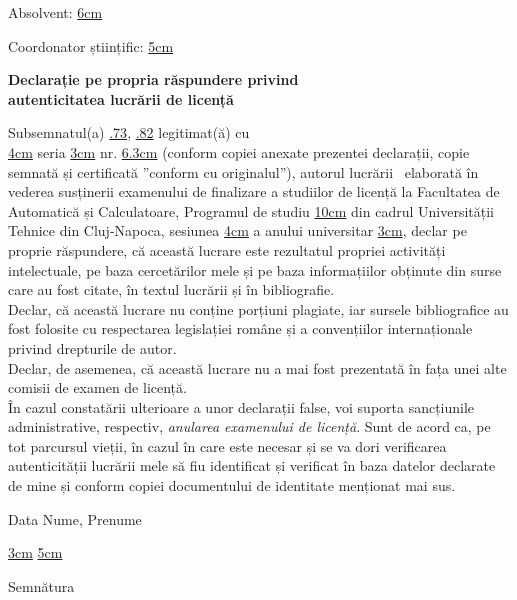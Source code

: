 \hspace{6cm} Absolvent: \uline{6cm} 

\vspace{0.5cm}
\hspace{6cm} Coordonator științific: \uline{5cm} 
\newpage
\begin{center}
	{\department}
\end{center}
\vspace{0.5cm}

\begin{center}
	{\bf Declarație pe propria răspundere privind\\ 
		autenticitatea lucrării de licență}
\end{center}
\vspace{1cm}

\begin{minipage}{\linewidth}
	Subsemnatul(a) \uline{.73\linewidth},
	\uline{.82\linewidth}
	legitimat(ă) cu\\ \uline{4cm} seria \uline{3cm} nr. \uline{6.3cm}
	(conform copiei anexate prezentei declarații, copie semnată și certificată ”conform cu originalul”), autorul lucrării\
	\uline{\linewidth}
	\uline{\linewidth}
	\uline{\linewidth}
	elaborată în vederea susținerii examenului de finalizare a studiilor de licență la Facultatea de Automatică și Calculatoare, Programul de studiu \uline{10cm} din cadrul Universității Tehnice din Cluj-Napoca, sesiunea \uline{4cm} a anului universitar \uline{3cm}, declar pe proprie răspundere, că această lucrare este rezultatul propriei activități intelectuale, pe baza cercetărilor mele și pe baza informațiilor obținute din surse care au fost citate, în textul lucrării și în bibliografie.\\
	Declar, că această lucrare nu conține porțiuni plagiate, iar sursele bibliografice au fost folosite cu respectarea legislației române și a convențiilor internaționale privind drepturile de autor.\\
	Declar, de asemenea, că această lucrare nu a mai fost prezentată în fața unei alte comisii de examen de licență.\\
	În cazul constatării ulterioare a unor declarații false, voi suporta sancțiunile administrative, respectiv, \emph{anularea examenului de licență}.
	Sunt de acord ca, pe tot parcursul vieții, în cazul în care este necesar și se va dori verificarea autenticității lucrării mele să fiu identificat și verificat în baza datelor declarate de mine și conform copiei documentului de identitate menționat mai sus.
\end{minipage}
\vspace{1.5cm}

Data \hspace{8cm} Nume, Prenume

\vspace{0.5cm}

\uline{3cm} \hspace{5cm} \uline{5cm}

\vspace{1cm}
\hspace{9.4cm}Semnătura
\newpage
